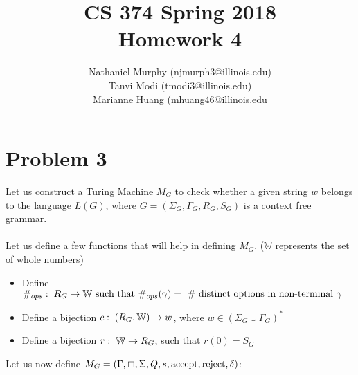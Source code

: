 \documentclass[11pt]{article}
\title{\textbf{CS 374 Spring 2018\\Homework 4}}
\author{Nathaniel Murphy (njmurph3@illinois.edu)\\
			Tanvi Modi (tmodi3@illinois.edu)\\
			Marianne Huang (mhuang46@illinois.edu}
\date{}
\begin{document}
\maketitle
\section*{Problem 3}
Let us construct a Turing Machine $M_G$ to check whether a given string $w$ belongs to the language $ L(G)$, where $G=(\Sigma_G,\Gamma_G,R_G,S_G)$ is a context free grammar. \\ \\
Let us define a few functions that will help in defining $M_G$. ($\mathbb{W}$ represents the set of whole numbers)
\begin{itemize}
	\item Define $\#_{ops}:\hspace{1mm}R_G\rightarrow\mathbb{W}\text{ such that }\#_{ops}(\gamma)=\text{ \# distinct options in non-terminal }\gamma$
	\item Define a bijection $c:\hspace{1mm}(R_G,\mathbb{W})\rightarrow w$, where $w\in(\Sigma_G\cup\Gamma_G)^*$
	\item Define a bijection $r:\hspace{1mm}\mathbb{W}\rightarrow R_G$, such that $r(0)=S_G$
\end{itemize}
Let us now define $M_G=(\Gamma,\boxempty,\Sigma,Q,s,\text{accept},\text{reject},\delta)$:
\end{document}
